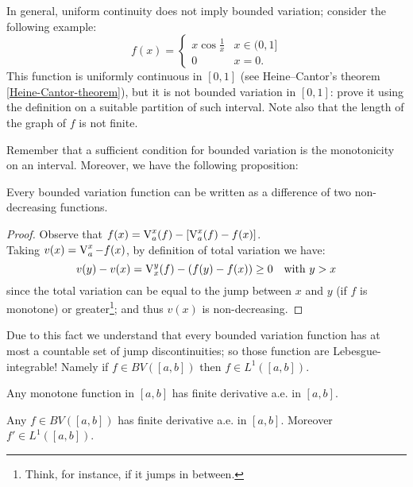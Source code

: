 In general, uniform continuity does not imply bounded variation; consider the following example:
$$f(x) = \begin{cases}
x \cos \frac 1 x & x \in (0,1] \\
0 & x=0.\end{cases}$$
This function is uniformly continuous in $[0,1]$ (see Heine--Cantor's theorem \vref{Heine-Cantor-theorem}), but it is not bounded variation in $[0,1]$: prove it using the definition on a suitable partition of such interval. Note also that the length of the graph of $f$ is not finite.

Remember that a sufficient condition for bounded variation is the monotonicity on an interval. Moreover, we have the following proposition:
\begin{prop} \label{theo-bv-non-decreasing}
	Every bounded variation function can be written as a difference of two non-decreasing functions.
\end{prop}
\begin{proof}
	Observe that $f(x)=\operatorname{V}^x_a(f) -[\operatorname{V}^x_a(f) - f(x)]$. \\ 
	Taking $v(x) = \operatorname{V}^x_a-f(x)$, by definition of total variation we have:
	$$v(y)-v(x) = \operatorname{V}_x^y (f) - (f(y)-f(x)) \geq 0 \quad \text{with }y>x$$
	since the total variation can be equal to the jump between $x$ and $y$ (if $f$ is monotone) or greater\footnote{Think, for instance, if it jumps in between.}; and thus $v(x)$ is non-decreasing.
\end{proof}

Due to this fact we understand that every bounded variation function has at most a countable set of jump discontinuities; so those function are Lebesgue-integrable! Namely if $f\in BV([a,b])$ then $f\in L^1([a,b])$.


\begin{theo}
	Any monotone function in $[a,b]$ has finite derivative a.e. in $[a,b]$.\footnotemark
\end{theo}
\begin{coro}\label{coro-deriv-bv}
	Any $f \in BV([a,b])$ has finite derivative a.e. in $[a,b]$. Moreover $f'\in L^1([a,b])$.
\end{coro}


